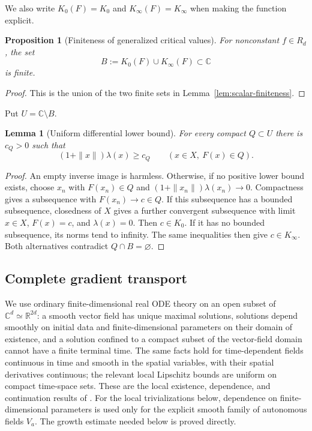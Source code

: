 \documentclass[11pt]{article}
\numberwithin{equation}{section}
\newtheorem{lemma}[theorem]{Lemma}
\newtheorem{proposition}[theorem]{Proposition}
\theoremstyle{definition}
\theoremstyle{remark}
\newcommand{\C}{\mathbb C}
\newcommand{\R}{\mathbb R}
\begin{document}
We also write $K_0(F)=K_0$ and $K_\infty(F)=K_\infty$ when making the
function explicit.
\begin{proposition}[Finiteness of generalized critical values]\label{prop:generalized-critical}
For nonconstant $f\in R_d$, the set
\[
 B:=K_0(F)\cup K_\infty(F)\subset\C
\]
is finite.
\end{proposition}
\begin{proof}
This is the union of the two finite sets in
Lemma~\ref{lem:scalar-finiteness}.
\end{proof}

Put $U=\C\setminus B$.
\begin{lemma}[Uniform differential lower bound]\label{lem:uniform-gradient}
For every compact $Q\subset U$ there is $c_Q>0$ such that
\begin{equation}\label{eq:malgrange-uniform}
 (1+\|x\|)\lambda(x)\ge c_Q
 \qquad(x\in X,\ F(x)\in Q).
\end{equation}
\end{lemma}
\begin{proof}
An empty inverse image is harmless. Otherwise, if no positive lower
bound exists, choose $x_n$ with $F(x_n)\in Q$ and
$(1+\|x_n\|)\lambda(x_n)\to0$. Compactness gives a subsequence with
$F(x_n)\to c\in Q$. If this subsequence has a bounded subsequence,
closedness of $X$ gives a further convergent subsequence with limit
$x\in X$, $F(x)=c$, and $\lambda(x)=0$. Then $c\in K_0$.
If it has no bounded subsequence, its norms tend to infinity. The same
inequalities then give $c\in K_\infty$.
Both alternatives contradict $Q\cap B=\varnothing$.
\end{proof}

\subsection{Complete gradient transport}
We use ordinary finite-dimensional real ODE theory on an open subset of
$\C^d\simeq\R^{2d}$: a smooth vector field has unique maximal solutions,
solutions depend smoothly on initial data and finite-dimensional
parameters on their domain of existence, and a solution confined to a
compact subset of the vector-field domain cannot have a finite terminal
time. The same facts hold for time-dependent fields continuous in time and
smooth in the spatial variables, with their spatial derivatives continuous;
the relevant local Lipschitz bounds are uniform on compact time-space sets.
These are the local existence, dependence, and continuation results of
\cite[Sections 2.2 and 2.4--2.6]{Teschl}. For the local trivializations
below, dependence on finite-dimensional parameters is used only for the
explicit smooth family of autonomous fields $V_a$. The growth estimate
needed below is proved directly.
\end{document}
